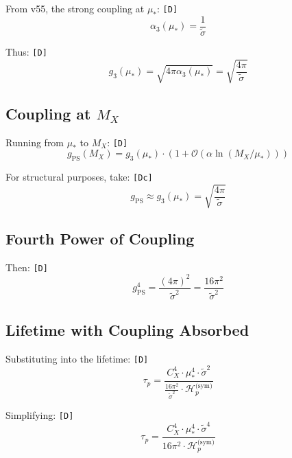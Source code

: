 \documentclass[11pt,a4paper]{article}
\newcommand{\tagD}{\textcolor{green!50!black}{\texttt{[D]}}}
\newcommand{\tagDc}{\textcolor{blue!70!black}{\texttt{[Dc]}}}
\theoremstyle{definition}
\begin{document}
From v55, the strong coupling at $\mu_*$: \tagD{}
\begin{equation}
\label{eq:alpha3-mustar}
\alpha_3(\mu_*) = \frac{1}{\tilde{\sigma}}
\end{equation}

Thus: \tagD{}
\begin{equation}
\label{eq:g3-mustar}
g_3(\mu_*) = \sqrt{4\pi \alpha_3(\mu_*)} = \sqrt{\frac{4\pi}{\tilde{\sigma}}}
\end{equation}

\subsection{Coupling at $M_X$}
\label{subsec:coupling-mx}

Running from $\mu_*$ to $M_X$: \tagD{}
\begin{equation}
\label{eq:coupling-running}
g_{\text{PS}}(M_X) = g_3(\mu_*) \cdot \left(1 + \mathcal{O}(\alpha \ln(M_X/\mu_*))\right)
\end{equation}

For structural purposes, take: \tagDc{}
\begin{equation}
\label{eq:gps-approx}
g_{\text{PS}} \approx g_3(\mu_*) = \sqrt{\frac{4\pi}{\tilde{\sigma}}}
\end{equation}

\subsection{Fourth Power of Coupling}
\label{subsec:coupling-fourth}

Then: \tagD{}
\begin{equation}
\label{eq:gps-fourth}
g_{\text{PS}}^4 = \frac{(4\pi)^2}{\tilde{\sigma}^2} = \frac{16\pi^2}{\tilde{\sigma}^2}
\end{equation}

\subsection{Lifetime with Coupling Absorbed}
\label{subsec:lifetime-coupling}

Substituting into the lifetime: \tagD{}
\begin{equation}
\label{eq:taup-coupling-subst}
\tau_p = \frac{C_X^4 \cdot \mu_*^4 \cdot \tilde{\sigma}^2}{\frac{16\pi^2}{\tilde{\sigma}^2} \cdot \mathcal{H}_p^{\text{(sym)}}}
\end{equation}

Simplifying: \tagD{}
\begin{equation}
\label{eq:taup-simplified}
\tau_p = \frac{C_X^4 \cdot \mu_*^4 \cdot \tilde{\sigma}^4}{16\pi^2 \cdot \mathcal{H}_p^{\text{(sym)}}}
\end{equation}
\end{document}

